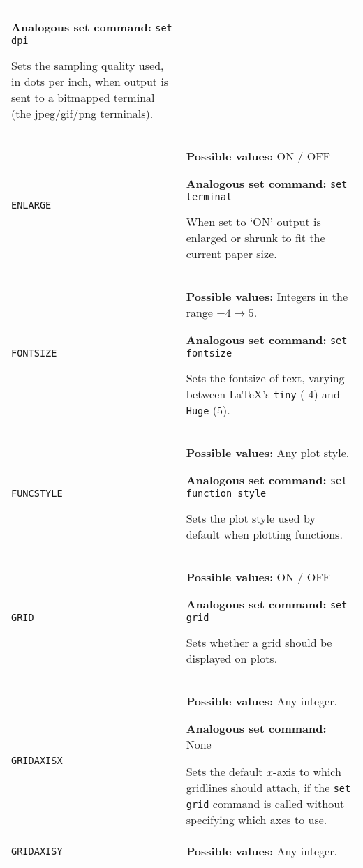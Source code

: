 \documentclass[a4paper,onecolumn,11pt]{book}
\begin{document}
\begin{longtable}{p{3.4cm}p{9cm}}
                   \textbf{Analogous set command:} \texttt{set dpi}\index{set dpi command@\texttt{set dpi} command}

                   Sets the sampling quality used, in dots per inch, when output is sent to a bitmapped terminal (the jpeg/gif/png terminals).
                   \\
\texttt{ENLARGE} & \textbf{Possible values:} ON / OFF

                   \textbf{Analogous set command:} \texttt{set terminal}\index{set terminal command@\texttt{set terminal} command}
                   
                   When set to `ON' output is enlarged or shrunk to fit the
                   current paper size.
                   \\

\texttt{FONTSIZE} & \textbf{Possible values:} Integers in the range $-4 \to 5$.

                   \textbf{Analogous set command:} \texttt{set fontsize}\index{set fontsize command@\texttt{set fontsize} command}

                   Sets the fontsize of text, varying between \LaTeX's \texttt{tiny} (-4) and \texttt{Huge} (5).
                   \\
\texttt{FUNCSTYLE} & \textbf{Possible values:} Any plot style.

                   \textbf{Analogous set command:} \texttt{set function style}\index{set function style command@\texttt{set function style} command}

                   Sets the plot style used by default when plotting functions.
                   \\
\texttt{GRID} & \textbf{Possible values:} ON / OFF

                   \textbf{Analogous set command:} \texttt{set grid}\index{set grid command@\texttt{set grid} command}

                   Sets whether a grid should be displayed on plots.
                   \\
\texttt{GRIDAXISX} & \textbf{Possible values:} Any integer.

                   \textbf{Analogous set command:} None

                   Sets the default $x$-axis to which gridlines should attach, if the \texttt{set grid} command is called without specifying which axes to use.
                   \\
\texttt{GRIDAXISY} & \textbf{Possible values:} Any integer.


\end{longtable}
\end{document}
